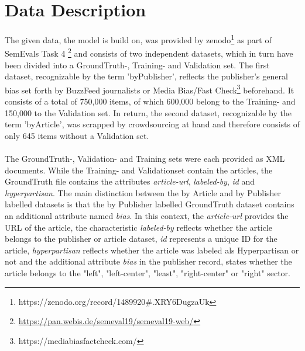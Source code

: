 \documentclass[a4paper, 11pt,titlepage,oneside,openany]{book}
\begin{document}
\chapter{Data Description}
\indent The given data, the model is build on, was provided by zenodo\footnote{https://zenodo.org/record/1489920\#.XRY6DugzaUk} as part of SemEvals Task 4 \footnote{\url{https://pan.webis.de/semeval19/semeval19-web/}} and consists of two independent datasets, which in turn have been divided into a GroundTruth-, Training- and Validation set.
The first dataset, recognizable by the term 'byPublisher', reflects the publisher's general bias set forth by BuzzFeed journalists or Media Bias/Fast Check\footnote{https://mediabiasfactcheck.com/} beforehand. It consists of a total of 750,000 items, of which 600,000 belong to the Training- and 150,000 to the Validation set.
In return, the second dataset, recognizable by the term 'byArticle', was scrapped by crowdsourcing at hand and therefore consists of only 645 items without a Validation set.\\
 \\
\indent The GroundTruth-, Validation- and Training sets were each provided as XML documents. While the Training- and Validationset contain the articles, the GroundTruth file contains the attributes \textit{article-url}, \textit{labeled-by}, \textit{id} and \textit{hyperpartisan}. The main distinction between the by Article and by Publisher labelled datasets is that the by Publisher labelled GroundTruth dataset contains an additional attribute named \textit{bias}. In this context, the \textit{article-url} provides the URL of the article, the characteristic \textit{labeled-by} reflects whether the article belongs to the publisher or article dataset, \textit{id} represents a unique ID for the article, \textit{hyperpartisan} reflects whether the article was labeled als Hyperpartisan or not and the additional attribute \textit{bias} in the publisher record, states whether the article belongs to the "left", "left-center", "least", "right-center" or "right" sector.
 
\newpage
\end{document}

